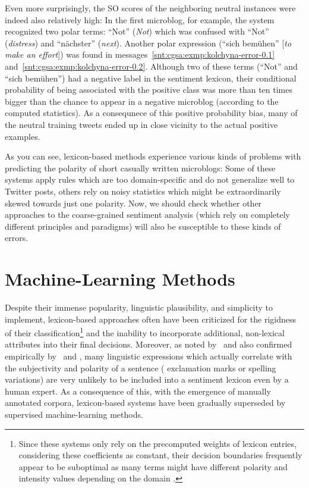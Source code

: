 \noindent Even more surprisingly, the SO scores of the neighboring
neutral instances were indeed also relatively high: In the first
microblog, for example, the system recognized two polar terms: ``Not''
(\emph{Not}) which was confused with ``Not'' (\emph{distress}) and
``n\"achster'' (\emph{next}).  Another polar expression (``sich
bem\"uhen'' [\emph{to make an effort}]) was found in
messages~\ref{snt:cgsa:exmp:kolchyna-error-0.1}
and~\ref{snt:cgsa:exmp:kolchyna-error-0.2}.  Although two of these
terms (``Not'' and ``sich bem\"uhen'') had a negative label in the
sentiment lexicon, their conditional probability of being associated
with the positive class was more than ten times bigger than the chance
to appear in a negative microblog (according to the computed
statistics). As a consequnece of this positive probability bias, many
of the neutral training tweets ended up in close vicinity to the
actual positive examples.

As you can see, lexicon-based methods experience various kinds of
problems with predicting the polarity of short casually written
microblogs: Some of these systems apply rules which are too
domain-specific and do not generalize well to Twitter posts, others
rely on noisy statistics which might be extraordinarily skewed towards
just one polarity.  Now, we should check whether other approaches to
the coarse-grained sentiment analysis (which rely on completely
different principles and paradigms) will also be susceptible to these
kinds of errors.

\section{Machine-Learning Methods}\label{sec:cgsa:ml-based}

Despite their immense popularity, linguistic plausibility, and
simplicity to implement, lexicon-based approaches often have been
criticized for the rigidness of their classification\footnote{Since
  these systems only rely on the precomputed weights of lexicon
  entries, considering these coefficients as constant, their decision
  boundaries frequently appear to be suboptimal as many terms might
  have different polarity and intensity values depending on the domain
  \cite[see][]{Eisenstein:17,Yang:17}.} and the inability to
incorporate additional, non-lexical attributes into their final
decisions.  Moreover, as noted by~\citet{Pang:02} and also confirmed
empirically by~\citet{Riloff:03} and \citet{Gamon:04}, many linguistic
expressions which actually correlate with the subjectivity and
polarity of a sentence (\eg{} exclamation marks or spelling
variations) are very unlikely to be included into a sentiment lexicon
even by a human expert.  As a consequence of this, with the emergence
of manually annotated corpora, lexicon-based systems have been
gradually superseded by supervised machine-learning methods.

